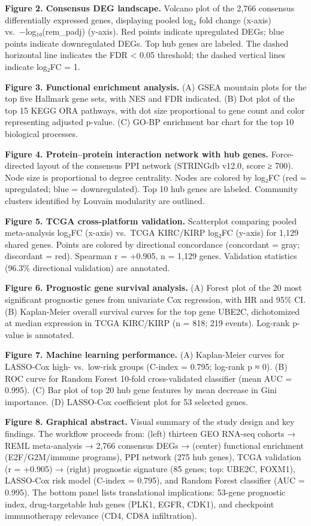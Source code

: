 \documentclass[
  12pt,
]{article}
\begin{document}
\textbf{Figure 2. Consensus DEG landscape.} Volcano plot of the 2,766
consensus differentially expressed genes, displaying pooled log₂ fold
change (x-axis) vs.~−log₁₀(rem\_padj) (y-axis). Red points indicate
upregulated DEGs; blue points indicate downregulated DEGs. Top hub genes
are labeled. The dashed horizontal line indicates the FDR \textless{}
0.05 threshold; the dashed vertical lines indicate
\textbar log₂FC\textbar{} = 1.

\textbf{Figure 3. Functional enrichment analysis.} (A) GSEA mountain
plots for the top five Hallmark gene sets, with NES and FDR indicated.
(B) Dot plot of the top 15 KEGG ORA pathways, with dot size proportional
to gene count and color representing adjusted p-value. (C) GO-BP
enrichment bar chart for the top 10 biological processes.

\textbf{Figure 4. Protein--protein interaction network with hub genes.}
Force-directed layout of the consensus PPI network (STRINGdb v12.0,
score ≥ 700). Node size is proportional to degree centrality. Nodes are
colored by log₂FC (red = upregulated; blue = downregulated). Top 10 hub
genes are labeled. Community clusters identified by Louvain modularity
are outlined.

\textbf{Figure 5. TCGA cross-platform validation.} Scatterplot comparing
pooled meta-analysis log₂FC (x-axis) vs.~TCGA KIRC/KIRP log₂FC (y-axis)
for 1,129 shared genes. Points are colored by directional concordance
(concordant = gray; discordant = red). Spearman r = +0.905, n = 1,129
genes. Validation statistics (96.3\% directional validation) are
annotated.

\textbf{Figure 6. Prognostic gene survival analysis.} (A) Forest plot of
the 20 most significant prognostic genes from univariate Cox regression,
with HR and 95\% CI. (B) Kaplan-Meier overall survival curves for the
top gene UBE2C, dichotomized at median expression in TCGA KIRC/KIRP (n =
818; 219 events). Log-rank p-value is annotated.

\textbf{Figure 7. Machine learning performance.} (A) Kaplan-Meier curves
for LASSO-Cox high- vs.~low-risk groups (C-index = 0.795; log-rank p ≈
0). (B) ROC curve for Random Forest 10-fold cross-validated classifier
(mean AUC = 0.995). (C) Bar plot of top 20 hub gene features by mean
decrease in Gini importance. (D) LASSO-Cox coefficient plot for 53
selected genes.

\textbf{Figure 8. Graphical abstract.} Visual summary of the study
design and key findings. The workflow proceeds from: (left) thirteen GEO
RNA-seq cohorts → REML meta-analysis → 2,766 consensus DEGs → (center)
functional enrichment (E2F/G2M/immune programs), PPI network (275 hub
genes), TCGA validation (r = +0.905) → (right) prognostic signature (85
genes; top: UBE2C, FOXM1), LASSO-Cox risk model (C-index = 0.795), and
Random Forest classifier (AUC = 0.995). The bottom panel lists
translational implications: 53-gene prognostic index, drug-targetable
hub genes (PLK1, EGFR, CDK1), and checkpoint immunotherapy relevance
(CD4, CD8A infiltration).
\end{document}
